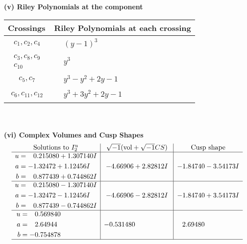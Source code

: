 \documentclass[1p]{elsarticle_modified}
\theoremstyle{definition}
\newcommand{\I}{\sqrt{-1}}
\begin{document}
\newpage\renewcommand{\arraystretch}{1}
\flushleft \textbf{(v) Riley Polynomials at the component}\newline \\
\begin{tabular}{m{50pt}|m{274pt}}
Crossings & \hspace{64pt}Riley Polynomials at each crossing \\
\hline $$\begin{aligned}c_{1},c_{2},c_{4}\end{aligned}$$&$\begin{aligned}
&(y-1)^3
\end{aligned}$\\
\hline $$\begin{aligned}c_{3},c_{8},c_{9}\\c_{10}\end{aligned}$$&$\begin{aligned}
&y^3
\end{aligned}$\\
\hline $$\begin{aligned}c_{5},c_{7}\end{aligned}$$&$\begin{aligned}
&y^3- y^2+2 y-1
\end{aligned}$\\
\hline $$\begin{aligned}c_{6},c_{11},c_{12}\end{aligned}$$&$\begin{aligned}
&y^3+3 y^2+2 y-1
\end{aligned}$\\
\hline
\end{tabular}\\~\\
\newpage\flushleft \textbf{(vi) Complex Volumes and Cusp Shapes}
$$\begin{array}{c|c|c}  
\text{Solutions to }I^u_{2}& \I (\text{vol} + \sqrt{-1}CS) & \text{Cusp shape}\\
 \hline 
\begin{aligned}
u &= \phantom{-}0.215080 + 1.307140 I \\
a &= -1.32472 + 1.12456 I \\
b &= \phantom{-}0.877439 + 0.744862 I\end{aligned}
 & -4.66906 + 2.82812 I & -1.84740 - 3.54173 I \\ \hline\begin{aligned}
u &= \phantom{-}0.215080 - 1.307140 I \\
a &= -1.32472 - 1.12456 I \\
b &= \phantom{-}0.877439 - 0.744862 I\end{aligned}
 & -4.66906 - 2.82812 I & -1.84740 + 3.54173 I \\ \hline\begin{aligned}
u &= \phantom{-}0.569840\phantom{ +0.000000I} \\
a &= \phantom{-}2.64944\phantom{ +0.000000I} \\
b &= -0.754878\phantom{ +0.000000I}\end{aligned}
 & -0.531480\phantom{ +0.000000I} & \phantom{-}2.69480\phantom{ +0.000000I}\\
 \hline 
 \end{array}$$\newpage
\end{document}
